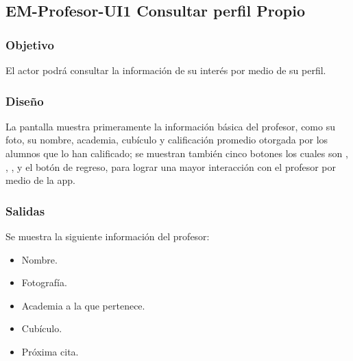 

\pagebreak
\subsection{EM-Profesor-UI1 Consultar perfil Propio}

\subsubsection{Objetivo}
	\noindent
	El actor podrá consultar la información de su interés por medio de su perfil.

\subsubsection{Diseño}
	\noindent
	La pantalla muestra primeramente la información básica del profesor, como su foto, su nombre, academia, cubículo y calificación promedio otorgada por los alumnos que lo han calificado; se muestran también cinco botones los cuales son , , ,  y el botón de regreso, para lograr una mayor interacción con el profesor por medio de la app.
 


\subsubsection{Salidas}
	Se muestra la siguiente información del profesor:
	\begin{itemize}
		\item Nombre.
		\item Fotografía. 
		\item Academia a la que pertenece.
		\item Cubículo.
		\item Próxima cita.
		
	\end{itemize}

